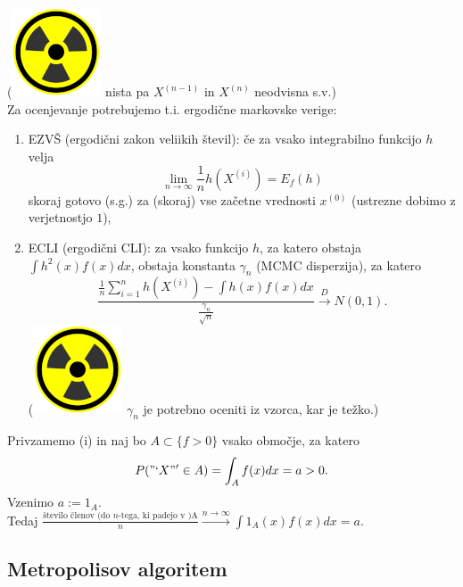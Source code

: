\documentclass[a4paper, 12pt]{book}
\theoremstyle{definition}
\theoremstyle{remark}
\begin{document}
(\includegraphics[scale=0.08]{radiation_symbol} nista pa $X^{(n-1)}$ in $X^{(n)}$ neodvisna s.v.) \\
Za ocenjevanje potrebujemo t.i. ergodične markovske verige:
\begin{enumerate}[label=(\alph*)]
  \item EZVŠ (ergodični zakon veliikih števil): če za vsako integrabilno funkcijo $h$ velja
    \begin{equation*}
      \lim_{n \to \infty} \frac{1}{n} h\left(X^{(i)}\right) = E_f(h)
    \end{equation*}
    skoraj gotovo (s.g.) za (skoraj) vse začetne vrednosti $x^{(0)}$ (ustrezne dobimo z verjetnostjo $1$),
  \item ECLI (ergodični CLI): za vsako funkcijo $h$, za katero obstaja $\int h^2(x) f(x) dx$,
    obstaja konstanta $\gamma_n$ (MCMC disperzija), za katero
    \begin{equation*}
      \frac{\frac{1}{n} \sum_{i=1}^{n} h\left(X^{(i)}\right) - \int h(x) f(x) dx}{\frac{\gamma_n}{\sqrt{n}}}
        \stackrel{D}{\to} N(0,1).
    \end{equation*}
    (\includegraphics[scale=0.08]{radiation_symbol} $\gamma_n$ je potrebno oceniti iz vzorca, kar je težko.)
\end{enumerate}
Privzamemo (i) in naj bo $A \subset \{f > 0\}$ vsako območje, za katero
\begin{equation*}
  P("`X"' \in A) = \int_A f(x) dx = a > 0.
\end{equation*}
Vzenimo $a := 1_A$. \\ %
Tedaj $\frac{\text{število členov (do $n$-tega, ki padejo v )A}}{n} \stackrel{n \to \infty}{\to} \int 1_A(x) f(x) dx = a$. %

\subsection{Metropolisov algoritem}
\end{document}
